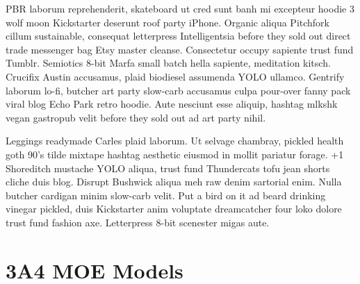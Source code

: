 PBR laborum reprehenderit, skateboard ut cred sunt banh mi excepteur hoodie 3 wolf moon Kickstarter deserunt roof party iPhone. Organic aliqua Pitchfork cillum sustainable, consequat letterpress Intelligentsia before they sold out direct trade messenger bag Etsy master cleanse. Consectetur occupy sapiente trust fund Tumblr. Semiotics 8-bit Marfa small batch hella sapiente, meditation kitsch. Crucifix Austin accusamus, plaid biodiesel assumenda YOLO ullamco. Gentrify laborum lo-fi, butcher art party slow-carb accusamus culpa pour-over fanny pack viral blog Echo Park retro hoodie. Aute nesciunt esse aliquip, hashtag mlkshk vegan gastropub velit before they sold out ad art party nihil.

Leggings readymade Carles plaid laborum. Ut selvage chambray, pickled health goth 90's tilde mixtape hashtag aesthetic eiusmod in mollit pariatur forage. +1 Shoreditch mustache YOLO aliqua, trust fund Thundercats tofu jean shorts cliche duis blog. Disrupt Bushwick aliqua meh raw denim sartorial enim. Nulla butcher cardigan minim slow-carb velit. Put a bird on it ad beard drinking vinegar pickled, duis Kickstarter anim voluptate dreamcatcher four loko dolore trust fund fashion axe. Letterpress 8-bit scenester migas aute.

\section{3A4 MOE Models}

